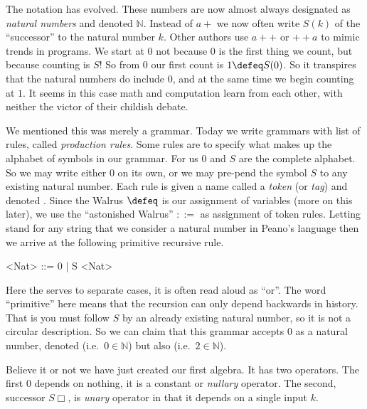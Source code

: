The notation has evolved.  These numbers are now almost always designated as
\emph{natural numbers} and denoted $\mathbb{N}$.  Instead of $a+$ we now 
often write $S(k)$ of the ``successor'' to the natural number $k$.  Other 
authors use $a++$ or $++a$ to mimic trends in programs.  We start at
$0$ not because $0$ is the first thing we count, but because counting is $S$! So
from $0$ our first count is $1\defeq S(0)$. So it transpires that the natural
numbers do include $0$, and at the same time we begin counting at $1$.  It seems
in this case math and computation  learn from each other, with neither the victor of 
their childish debate.

We mentioned this was merely a grammar.  Today we write grammars with 
list of rules, called \emph{production rules}.  Some rules are to specify 
what makes up the alphabet of symbols in our grammar.  For us $0$ and $S$
are the complete alphabet.  So we may write either $0$ on its own, or 
we may pre-pend the symbol $S$ to any existing natural number.  
Each rule is given a name called a \emph{token} (or \emph{tag}) and 
denoted . Since the Walrus
$\defeq$ is our assignment of variables (more on this later), 
we use the ``astonished Walrus'' $::=$
as assignment of token rules. 
Letting 
 stand for any string that we consider a natural number 
in Peano's language then we arrive at the following primitive recursive rule.
\begin{center}
\begin{gcode}[]
<Nat> ::= 0 | S <Nat>
\end{gcode}
\end{center}
Here the \code{|} serves to separate cases, it is often read aloud as ``or''.
The word ``primitive'' here means that the recursion can only depend backwards 
in history. That is you must follow $S$ by an already existing natural number,
so it is not a circular description.
So we can claim that this grammar accepts $0$ as a natural number, denoted 
 (i.e.\ $0\in\mathbb{N}$) but also  (i.e.\ $2\in \mathbb{N}$).

Believe it or not we have just created our first algebra.  It has two 
operators.  The first $0$ depends on nothing, it is a constant or 
\emph{nullary} operator.  The second, successor $S\Box$, is \emph{unary} operator
in that it depends on a single input $k$. 



